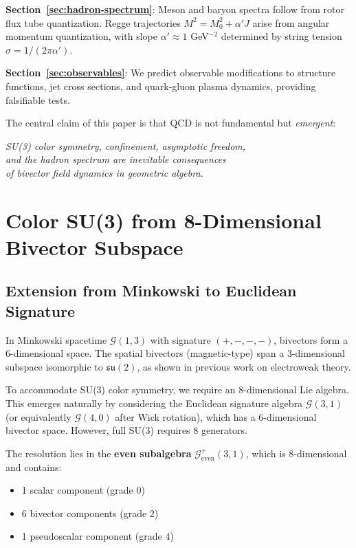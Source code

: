 \documentclass[11pt,a4paper]{article}
\newcommand{\Cl}{\mathcal{G}}
\theoremstyle{definition}
\theoremstyle{plain}
\theoremstyle{remark}
\begin{document}
\textbf{Section~\ref{sec:hadron-spectrum}}: Meson and baryon spectra follow from rotor flux tube quantization. Regge trajectories $M^2 = M_0^2 + \alpha' J$ arise from angular momentum quantization, with slope $\alpha' \approx 1$ GeV$^{-2}$ determined by string tension $\sigma = 1/(2\pi\alpha')$.

\textbf{Section~\ref{sec:observables}}: We predict observable modifications to structure functions, jet cross sections, and quark-gluon plasma dynamics, providing falsifiable tests.

The central claim of this paper is that QCD is not fundamental but \emph{emergent}:

\begin{center}
\textit{SU(3) color symmetry, confinement, asymptotic freedom, \\
and the hadron spectrum are inevitable consequences \\
of bivector field dynamics in geometric algebra.}
\end{center}

\vspace{1em}

\section{Color SU(3) from 8-Dimensional Bivector Subspace}
\label{sec:color-su3}

\subsection{Extension from Minkowski to Euclidean Signature}

In Minkowski spacetime $\Cl(1,3)$ with signature $(+,-,-,-)$, bivectors form a 6-dimensional space. The spatial bivectors (magnetic-type) span a 3-dimensional subspace isomorphic to $\mathfrak{su}(2)$, as shown in previous work on electroweak theory.

To accommodate SU(3) color symmetry, we require an 8-dimensional Lie algebra. This emerges naturally by considering the Euclidean signature algebra $\Cl(3,1)$ (or equivalently $\Cl(4,0)$ after Wick rotation), which has a 6-dimensional bivector space. However, full SU(3) requires 8 generators.

The resolution lies in the \textbf{even subalgebra} $\Cl^+_{\mathrm{even}}(3,1)$, which is 8-dimensional and contains:
\begin{itemize}[leftmargin=*,itemsep=3pt]
  \item 1 scalar component (grade 0)
  \item 6 bivector components (grade 2)
  \item 1 pseudoscalar component (grade 4)
\end{itemize}
\end{document}
